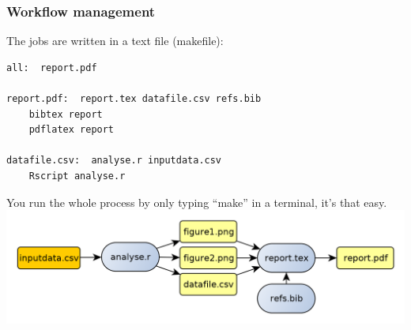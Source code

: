 \documentclass[9pt,xcolor=pdftex,dvipsnames,table]{beamer}
\begin{document}
\begin{frame}[fragile] 
\frametitle{\textbf{Workflow management}}
The jobs are written in a text file (makefile):
\small{
\begin{verbatim}
all:  report.pdf

report.pdf:  report.tex datafile.csv refs.bib
    bibtex report 
    pdflatex report

datafile.csv:  analyse.r inputdata.csv
    Rscript analyse.r
\end{verbatim}}
\vspace{0.25cm}
You run the whole process by only typing ``make'' in a terminal, it's
that easy.
\includegraphics[width=1\textwidth]{images/workflow.png}
\vspace{-1cm}
\end{frame}
\end{document}
